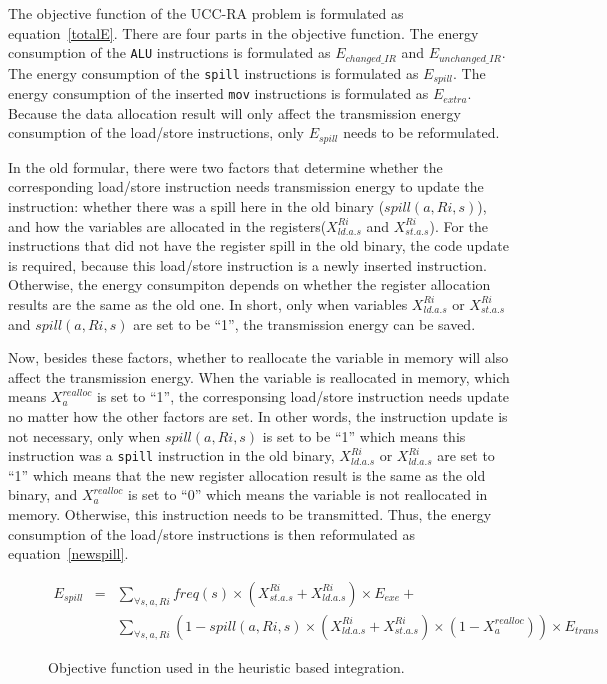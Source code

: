 The objective function of the UCC-RA problem is formulated as equation~\ref{totalE}.
There are four parts in the objective function.
The energy consumption of the {\tt ALU} instructions is formulated as $E_{changed\_IR}$ and $E_{unchanged\_IR}$.
The energy consumption of the {\tt spill} instructions is formulated as $E_{spill}$.
The energy consumption of the inserted {\tt mov} instructions is formulated as $E_{extra}$.
Because the data allocation result will only affect the transmission energy consumption of the load/store
instructions, only $E_{spill}$ needs to be reformulated.

In the old formular, there were two factors that determine whether the corresponding load/store instruction needs transmission energy
to update the instruction:
whether there was a spill here in the old binary ($spill(a,Ri,s)$), and how the variables are allocated in the registers($X_{ld.a.s}^{Ri}$ and $X_{st.a.s}^{Ri}$).
For the instructions that did not have the register spill in the old binary, the code
update is required, because this load/store instruction is a newly inserted instruction.
Otherwise, the energy consumpiton depends on whether the register allocation results
are the same as the old one.
In short, only when variables $X_{ld.a.s}^{Ri}$ or $X_{st.a.s}^{Ri}$ and $spill(a,Ri,s)$
are set to be ``1'', the transmission energy can be saved.

Now, besides these factors, whether to reallocate the variable in memory will also
affect the transmission energy.
When the variable is reallocated in memory, which means $X_{a}^{realloc}$
is set to ``1'', the corresponsing load/store instruction needs update
no matter how the other factors are set.
In other words, the instruction update is not necessary, 
only when $spill(a,Ri,s)$ is set to be ``1'' which means this instruction was a 
{\tt spill} instruction in the old binary, 
$X_{ld.a.s}^{Ri}$ or $X_{ld.a.s}^{Ri}$ are set to ``1'' which means that the new
register allocation result is the same as the old binary, 
and  $X_{a}^{realloc}$
is set to ``0'' which means the variable is not reallocated in memory.
Otherwise, this instruction needs to be transmitted.
Thus, the energy consumption of the load/store instructions is then reformulated as equation~\ref{newspill}.

\begin{figure}[ht]
\begin{small}
\begin{eqnarray}
E_{spill} &=& \sum_{\forall s, a, Ri}
freq(s) \times (X_{st.a.s}^{Ri}+X_{ld.a.s}^{Ri}) \times E_{exe} + \nonumber\\
					& & \sum_{\forall s, a, Ri}(1-spill(a,Ri,s)\times
 (X_{ld.a.s}^{Ri}+X_{st.a.s}^{Ri})\times (1-X_{a}^{realloc}))\times E_{trans} \label{newspill} 
\end{eqnarray}
\end{small}
\caption{Objective function used in the heuristic based integration.}
\label{newObj2}
\end{figure}

